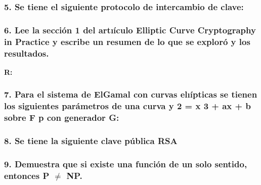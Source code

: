 \documentclass[14pt]{article}
\begin{document}
\subsubsection*{5. Se tiene el siguiente protocolo de intercambio de clave:}

\subsubsection*{6. Lee la sección 1 del artıículo Elliptic Curve Cryptography in Practice y escribe un resumen de lo que se exploró y los resultados.}
\textbf{R:}

\subsubsection*{7. Para el sistema de ElGamal con curvas elıípticas se tienen los siguientes parámetros de una curva y 2 = x 3 + ax + b sobre F p con generador G:}

\subsubsection*{8. Se tiene la siguiente clave pública RSA}

\subsubsection*{9. Demuestra que si existe una función de un solo sentido, entonces P $\neq$ NP.}
\end{document}
